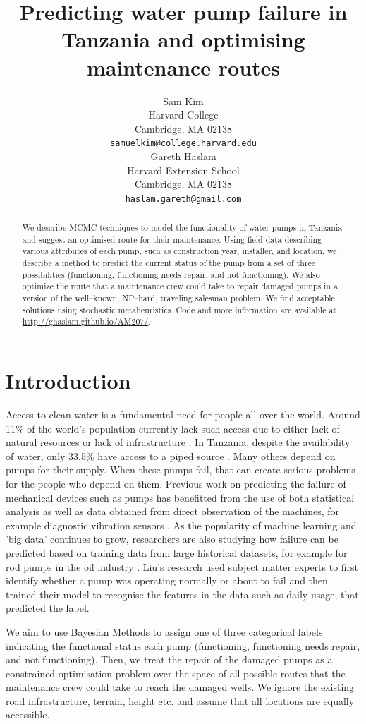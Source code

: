 \documentclass{article} %
\title{Predicting water pump failure in Tanzania and optimising maintenance routes}
\author{
Sam Kim \\
Harvard College\\
Cambridge, MA 02138 \\
\texttt{samuelkim@college.harvard.edu} \\
\And
Gareth Haslam \\
Harvard Extension School\\
Cambridge, MA 02138 \\
\texttt{haslam.gareth@gmail.com} \\
}
\begin{document}
\maketitle

\begin{abstract}
We describe MCMC techniques to model the functionality of water pumps in Tanzania and suggest an optimised route for their maintenance. Using field data describing various attributes of each pump, such as construction year, installer, and location, we describe a method to predict the current status of the pump from a set of three possibilities (functioning, functioning needs repair, and not functioning). We also optimize the route that a maintenance crew could take to repair damaged pumps in a version of the well--known, NP--hard, traveling salesman problem. We find acceptable solutions using stochastic metaheuristics. Code and more information are available at \url{http://ghaslam.github.io/AM207/}.
\end{abstract}

\section{Introduction}

Access to clean water is a fundamental need for people all over the world. Around 11\% of the world's population currently lack such access due to either lack of natural resources or lack of infrastructure \cite{UN2013}. In Tanzania, despite the availability of water, only 33.5\% have access to a piped source \cite{Morisset2012}. Many others depend on pumps for their supply. When these pumps fail, that can create serious problems for the people who depend on them. Previous work on predicting the failure of mechanical devices such as pumps has benefitted from the use of both statistical analysis as well as data obtained from direct observation of the machines, for example diagnostic vibration sensors \cite{Nakamura2007}. As the popularity of machine learning and 'big data' continues to grow, researchers are also studying how failure can be predicted based on training data from large historical datasets, for example for rod pumps in the oil industry \cite{Liu2013}. Liu's research used subject matter experts to first identify whether a pump was operating normally or about to fail and then trained their model to recognise the features in the data such as daily usage, that predicted the label. 

We aim to use Bayesian Methods to assign one of three categorical labels indicating the functional status each pump (functioning, functioning needs repair, and not functioning). Then, we treat the repair of the damaged pumps as a constrained optimisation problem over the space of all possible routes that the maintenance crew could take to reach the damaged wells. We ignore the existing road infrastructure, terrain, height etc. and assume that all locations are equally accessible. 
\end{document}
